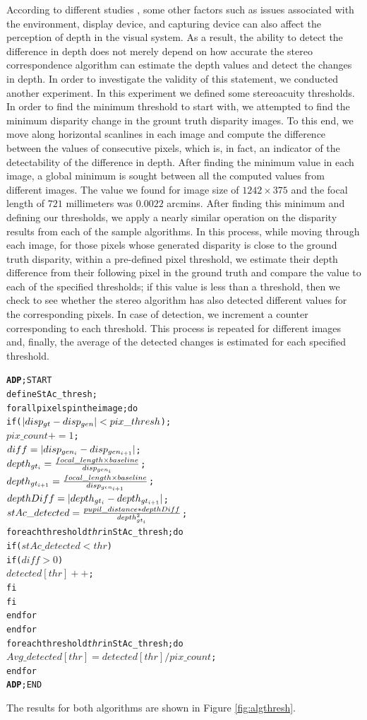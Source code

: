 According to different studies \cite{dras96, kru10,azuma01}, some other factors such as issues associated with the environment, display device, and capturing device
can also affect the perception of depth in the visual system. As a result, the ability to detect the difference in depth 
does not merely depend on how accurate the stereo correspondence algorithm can estimate the depth values and detect the changes in depth.
In order to investigate the validity of this statement, we conducted another experiment. In this experiment we defined some stereoacuity thresholds. 
In order to find the minimum threshold to start with, we attempted to find the 
minimum disparity change in the grount truth disparity images. To this end, we move along horizontal scanlines in each image and 
compute the difference between the values of consecutive pixels, which is, in fact, an indicator of the detectability of the difference in depth. 
After finding the minimum value in each image, a global minimum is sought between all the computed values from different images.
The value we found for image size of $1242\times375$ and the focal length of $721$ millimeters was $0.0022$ arcmins.
After finding this minimum and defining our thresholds, we apply a nearly similar operation on the disparity results from each of the sample algorithms.
In this process, while moving through each image, for those pixels whose generated disparity is close to the ground truth disparity, within a pre-defined pixel threshold, 
we estimate their depth difference from their following pixel
in the ground truth and compare the value to each of the specified thresholds; if this value is less than a threshold, then we check to see whether
the stereo algorithm has also detected different values for the corresponding pixels. 
In case of detection, we increment a counter corresponding to each threshold.
This process is repeated for different images and, finally, the average of the detected changes is estimated for each specified threshold.

\begin{alltt}
\textbf{ADP}; START
      define StAc\_thresh;
      for all pixels p in the image; do
         if (\( |disp\sb{gt}-disp\sb{gen}|<pix\_thresh\));
            \(pix\_count += 1\);
            \(diff = |disp\sb{gen\sb{i}}-disp\sb{gen\sb{i+1}}|\);
            \(depth\sb{gt\sb{i}} = \frac{focal\_length \times baseline}{disp\sb{gen\sb{i}}}\);
            \(depth\sb{gt\sb{i+1}} = \frac{focal\_length \times baseline}{disp\sb{gen\sb{i+1}}}\);
            \(depthDiff = |depth\sb{gt\sb{i}}-depth\sb{gt\sb{i+1}}|\);
            \(stAc\_detected = \frac{pupil\_distance*depthDiff}{depth\sb{gt\sb{i}}\sp{2}}\);
            for each threshold \textit{thr} in StAc\_thresh; do
               if (\(stAc\_detected<thr\))
                  if (\(diff>0\))
                     \(detected[thr]++\);
                  fi
               fi
            end for
      end for
      for each threshold \textit{thr} in StAc\_thresh; do
         \(Avg\_detected[thr] = detected[thr]/pix\_count\);
      end for
\textbf{ADP}; END
\end{alltt}
The results for both algorithms are shown in Figure \ref{fig:algthresh}.

